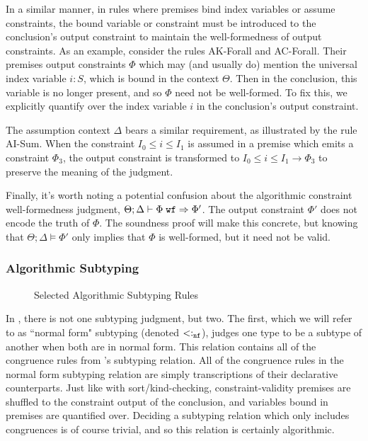In a similar manner, in rules where premises bind index variables or assume constraints, the bound variable or constraint must be introduced to the conclusion's output constraint to maintain the well-formedness of output constraints. As an example, consider the rules AK-Forall and AC-Forall. Their premises output constraints $\Phi$ which may (and usually do) mention the universal index variable $i : S$, which is bound in the context $\Theta$. Then in the conclusion, this variable is no longer present, and so $\Phi$ need not be well-formed. To fix this, we explicitly quantify over the index variable $i$ in the conclusion's output constraint. 

The assumption context $\Delta$ bears a similar requirement, as illustrated by the rule AI-Sum. When the constraint $I_0 \leq i \leq I_1$ is assumed in a premise which emits a constraint $\Phi_3$, the output constraint is transformed to $I_0 \leq i \leq I_1 \to \Phi_3$ to preserve the meaning of the judgment.

Finally, it's worth noting a potential confusion about the algorithmic constraint well-formedness judgment, $\Theta ; \Delta \vdash \Phi \; \texttt{wf} \Rightarrow \Phi'$.
The output constraint $\Phi'$ does not encode the truth of $\Phi$. The soundness proof will make this concrete, but knowing that $\Theta ; \Delta \vDash \Phi'$ only implies that $\Phi$ is well-formed, but it need not be valid.

\subsubsection{Algorithmic Subtyping}

\begin{figure}

\label{fig:bilambdaamor-selected-subty-rules}
\caption{Selected Algorithmic Subtyping Rules}
\end{figure}

In \bilambdaamor, there is not one subtyping judgment, but two. The first, which we will refer to as ``normal form" subtyping (denoted $<:_{\texttt{nf}}$),  judges one type to be a subtype of another when both are in normal form. This relation contains all of the congruence rules from \dlambdaamor's subtyping relation. All of the congruence rules in the normal form subtyping relation are simply transcriptions of their declarative counterparts. Just like with sort/kind-checking, constraint-validity premises are shuffled to the constraint output of the conclusion, and variables bound in premises are quantified over. Deciding a subtyping relation which only includes congruences is of course trivial, and so this relation is certainly algorithmic.

